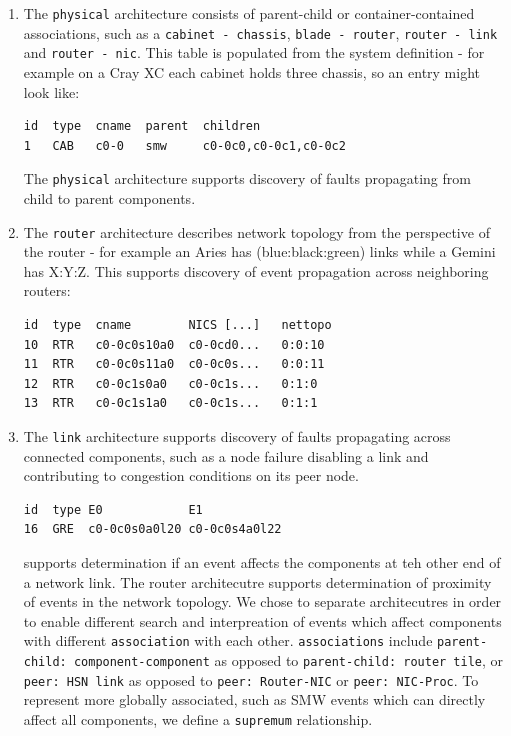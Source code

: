 \begin{enumerate}
\item The \texttt{physical} architecture consists of parent-child or
container-contained associations, such as a \texttt{cabinet - chassis}, 
\texttt{blade - router}, \texttt{router - link} and \texttt{router - nic}.
This table is populated from the system definition - for example on a 
Cray XC each cabinet holds three chassis, so an entry might look like:

\begin{small}
\begin{verbatim}
id  type  cname  parent  children
1   CAB   c0-0   smw     c0-0c0,c0-0c1,c0-0c2
\end{verbatim}
\end{small}

The \texttt{physical} architecture supports discovery of faults 
propagating from child to parent components.

\item The \texttt{router} architecture describes network topology
from the perspective of the router - for example an Aries has 
(blue:black:green) links while a Gemini has X:Y:Z. This supports
discovery of event propagation across neighboring routers:

\begin{small}
\begin{verbatim}
id  type  cname        NICS [...]   nettopo
10  RTR   c0-0c0s10a0  c0-0cd0...   0:0:10
11  RTR   c0-0c0s11a0  c0-0c0s...   0:0:11
12  RTR   c0-0c1s0a0   c0-0c1s...   0:1:0
13  RTR   c0-0c1s1a0   c0-0c1s...   0:1:1
\end{verbatim}
\end{small}


\item The \texttt{link} architecture supports 
discovery of faults propagating across connected components,
such as a node failure disabling a link and contributing to 
congestion conditions on its peer node.

\begin{small}
\begin{verbatim}
id  type E0            E1            
16  GRE  c0-0c0s0a0l20 c0-0c0s4a0l22 
\end{verbatim}
\end{small}


supports determination if an event affects the
components at teh other end of a network link. The router architecutre
supports determination of proximity of events in the network topology.
We chose to separate architecutres in order to enable different
search and interpreation of events which affect components with
different \texttt{association} with each other. 
\texttt{associations}
include \texttt{parent-child: component-component} as opposed to
\texttt{parent-child: router tile}, or \texttt{peer: HSN link}
as opposed to \texttt{peer: Router-NIC} or \texttt{peer: NIC-Proc}.
To represent more globally associated, such as SMW
events which can directly affect all components, we define
a \texttt{supremum} relationship.

\end{enumerate}


